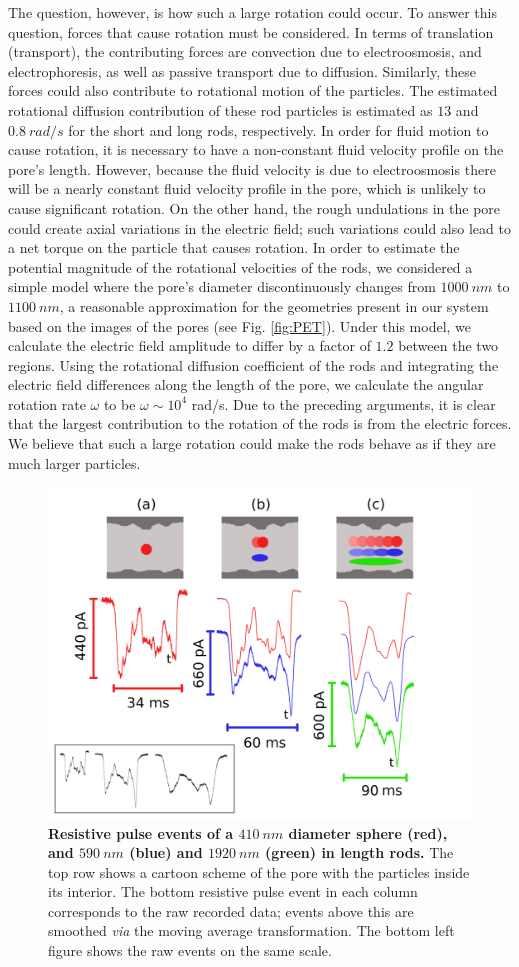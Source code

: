 		The question, however, is how such a large rotation could occur. To answer this question, forces that cause rotation must be considered. In terms of translation (transport), the contributing forces are convection due to electroosmosis, and electrophoresis, as well as passive transport due to diffusion. Similarly, these forces could also contribute to rotational motion of the particles. The estimated rotational diffusion contribution of these rod particles is estimated as $13$ and $\SI{0.8}{rad/s}$ for the short and long rods, respectively. In order for fluid motion to cause rotation, it is necessary to have a non-constant fluid velocity profile on the pore's length. However, because the fluid velocity is due to electroosmosis there will be a nearly constant fluid velocity profile in the pore, which is unlikely to cause significant rotation. On the other hand, the rough undulations in the pore could create axial variations in the electric field; such variations could also lead to a net torque on the particle that causes rotation. In order to estimate the potential magnitude of the rotational velocities of the rods, we considered a simple model where the pore's diameter discontinuously changes from $\SI{1000}{nm}$ to $\SI{1100}{nm}$, a reasonable approximation for the geometries present in our system based on the images of the pores (see Fig. \ref{fig:PET}). Under this model, we calculate the electric field amplitude to differ by a factor of $1.2$ between the two regions. Using the rotational diffusion coefficient of the rods and integrating the electric field differences along the length of the pore, we calculate the angular rotation rate $\omega$ to be $\omega\sim10^{4}$ rad/s. Due to the preceding arguments, it is clear that the largest contribution to the rotation of the rods is from the electric forces. We believe that such a large rotation could make the rods behave as if they are much larger particles.
		
		\begin{figure}
			\includegraphics[width=.5\textwidth]{PETevents}
			\caption{\textbf{Resistive pulse events of a $\SI{410}{nm}$ diameter sphere (red), and $\SI{590}{nm}$ (blue) and $\SI{1920}{nm}$ (green) in length rods.} The top row shows a cartoon scheme of the pore with the particles inside its interior. The bottom resistive pulse event in each column corresponds to the raw recorded data; events above this are smoothed \textit{via} the moving average transformation. The bottom left figure shows the raw events on the same scale.}
			\label{fig:PETevents}
		\end{figure}

